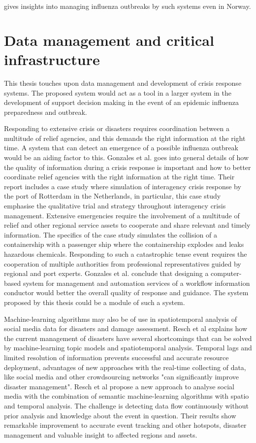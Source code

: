 gives insights into managing influenza outbreaks by such systems even in Norway.






\section{Data management and critical infrastructure}
This thesis touches upon data management and development of crisis response systems. The proposed system would act as a tool in a larger system in the development of support decision making in the event of an epidemic influenza preparedness and outbreak. 

Responding to extensive crisis or disasters requires coordination between a multitude of relief agencies, and this demands the right information at the right time. A system that can detect an emergence of a possible influenza outbreak would be an aiding factor to this. Gonzales et al. \cite{gonzalez2009framework} goes into general details of how the quality of information during a crisis response is important and how to better coordinate relief agencies with the right information at the right time. Their report includes a case study where simulation of interagency crisis response by the port of Rotterdam in the Netherlands, in particular, this case study emphasise the qualitative trial and strategy throughout interagency crisis management. Extensive emergencies require the involvement of a multitude of relief and other regional service assets to cooperate and share relevant and timely information. The specifics of the case study simulates the collision of a containership with a passenger ship where the containership explodes and leaks hazardous chemicals. Responding to such a catastrophic tense event requires the cooperation of multiple authorities from professional representatives guided by regional and port experts. Gonzales et al. conclude that designing a computer-based system for management and automation services of a workflow information conductor would better the overall quality of response and guidance. The system proposed by this thesis could be a module of such a system. 

Machine-learning algorithms may also be of use in spatiotemporal analysis of social media data for disasters and damage assessment. Resch et al \cite{resch2018combining} explains how the current management of disasters have several shortcomings that can be solved by machine-learning topic models and spatiotemporal analysis. Temporal lags and limited resolution of information prevents successful and accurate resource deployment, advantages of new approaches with the real-time collecting of data, like social media and other crowdsourcing networks "can significantly improve disaster management". Resch et al propose a new approach to analyse social media with the combination of semantic machine-learning algorithms with spatio and temporal analysis. The challenge is detecting data flow continuously without prior analysis and knowledge about the event in question. Their results show remarkable improvement to accurate event tracking and other hotspots, disaster management and valuable insight to affected regions and assets.

